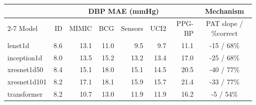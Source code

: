 \begin{tabular}{lrrrrrrc}
\toprule
& \multicolumn{6}{c}{DBP MAE (mmHg)} & Mechanism \\
\cmidrule(lr){2-7}
Model & ID & MIMIC & BCG & Sensors & UCI2 & PPG-BP & PAT slope / \%correct \\
\midrule
lenet1d & 8.6 & 13.1 & 11.0 & 9.5 & 9.7 & 11.1 & -15 / 68\% \\
inception1d & 8.0 & 13.5 & 15.2 & 13.2 & 13.4 & 17.0 & -25 / 68\% \\
xresnet1d50 & 8.4 & 15.1 & 18.0 & 15.1 & 14.5 & 20.5 & -40 / 77\% \\
xresnet1d101 & 8.2 & 17.1 & 18.1 & 15.9 & 15.7 & 21.4 & -33 / 77\% \\
transformer & 8.2 & 10.7 & 13.0 & 11.9 & 11.9 & 16.2 & -5 / 54\% \\
\bottomrule
\end{tabular}